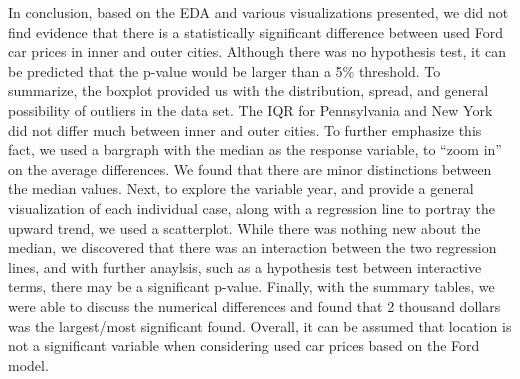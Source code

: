 \documentclass[
]{article}
\begin{document}
In conclusion, based on the EDA and various visualizations presented, we
did not find evidence that there is a statistically significant
difference between used Ford car prices in inner and outer cities.
Although there was no hypothesis test, it can be predicted that the
p-value would be larger than a 5\% threshold. To summarize, the boxplot
provided us with the distribution, spread, and general possibility of
outliers in the data set. The IQR for Pennsylvania and New York did not
differ much between inner and outer cities. To further emphasize this
fact, we used a bargraph with the median as the response variable, to
``zoom in'' on the average differences. We found that there are minor
distinctions between the median values. Next, to explore the variable
year, and provide a general visualization of each individual case, along
with a regression line to portray the upward trend, we used a
scatterplot. While there was nothing new about the median, we discovered
that there was an interaction between the two regression lines, and with
further anaylsis, such as a hypothesis test between interactive terms,
there may be a significant p-value. Finally, with the summary tables, we
were able to discuss the numerical differences and found that 2 thousand
dollars was the largest/most significant found. Overall, it can be
assumed that location is not a significant variable when considering
used car prices based on the Ford model.
\end{document}
